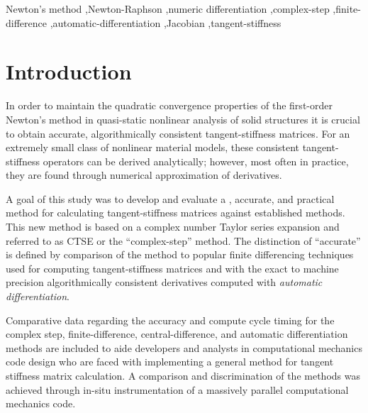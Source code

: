 \documentclass[preprint,12pt]{elsarticle}
\begin{document}
\begin{frontmatter}
\begin{abstract}
\end{abstract}

\begin{keyword}
Newton's method \sep Newton-Raphson \sep numeric differentiation \sep complex-step \sep finite-difference \sep automatic-differentiation \sep Jacobian \sep tangent-stiffness
\end{keyword}

\end{frontmatter}



\section{Introduction}
\label{sec:intro} 

In order to maintain the quadratic convergence properties of the first-order
Newton's method \cite{belytschko1999nonlinear} \cite[Ch.~13]{young2009} in
quasi-static nonlinear analysis of solid structures it is crucial to obtain
accurate, algorithmically consistent tangent-stiffness matrices. For an
extremely small class of nonlinear material models, these consistent
tangent-stiffness operators can be derived analytically; however, most often in
practice, they are found through numerical approximation of derivatives. 

A goal of this study was to develop and evaluate a 
, accurate, and practical method
for calculating tangent-stiffness matrices against established methods.  This
new method is based on a complex number Taylor series expansion and referred to
as CTSE or the ``complex-step'' method.  The distinction of ``accurate'' is
defined by comparison of the  method to popular finite differencing
techniques used for computing tangent-stiffness matrices and with the exact to
machine precision algorithmically consistent derivatives computed with
\emph{automatic differentiation}.

Comparative data regarding the accuracy and compute cycle timing for the
complex step, finite-difference, central-difference, and automatic
differentiation methods are included to aide developers and analysts in
computational mechanics code design who are faced with implementing a general
method for tangent stiffness matrix calculation.  A comparison and
discrimination of the methods was achieved through in-situ instrumentation of a
massively parallel computational mechanics code. 
\end{document}
